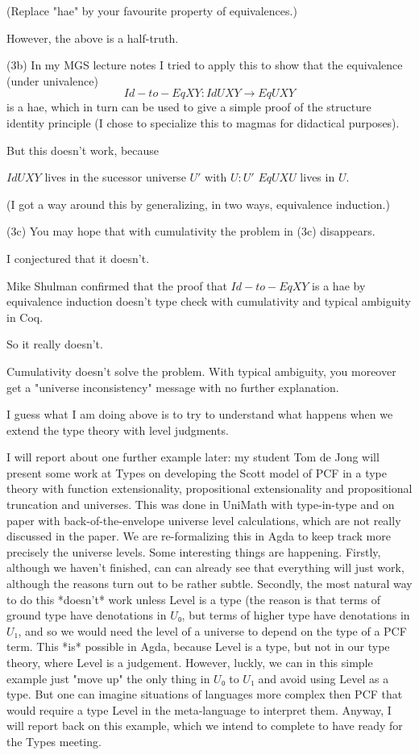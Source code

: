 \documentclass[11pt,a4paper]{article}
\begin{document}
     (Replace "hae" by your favourite property of equivalences.)

     However, the above is a half-truth.

(3b) In my MGS lecture notes I tried to apply this to show that the
      equivalence (under univalence)
$$
      Id-to-Eq X Y : Id U X Y →  Eq U X Y
$$
      is a hae, which in turn can be used to give a simple proof of the
      structure identity principle (I chose to specialize this to
      magmas for didactical purposes).

      But this doesn't work, because

          $Id U X Y$ lives in the sucessor universe $U'$ with $U:U'$
          $Eq U X U$ lives in $U$.

      (I got a way around this by generalizing, in two ways,
      equivalence induction.)

(3c) You may hope that with cumulativity the problem in (3c) disappears.

      I conjectured that it doesn't.

      Mike Shulman confirmed that the proof that $Id-to-Eq X Y$ is a hae
      by equivalence induction doesn't type check with cumulativity and
      typical ambiguity in Coq.

      So it really doesn't.

      Cumulativity doesn't solve the problem. With typical ambiguity,
      you moreover get a "universe inconsistency" message with no
      further explanation.

I guess what I am doing above is to try to understand what happens
when we extend the type theory with level judgments.

I will report about one further example later: my student Tom de Jong
will present some work at Types on developing the Scott model of PCF
in a type theory with function extensionality, propositional
extensionality and propositional truncation and universes. This was
done in UniMath with type-in-type and on paper with
back-of-the-envelope universe level calculations, which are not really
discussed in the paper. We are re-formalizing this in Agda to keep
track more precisely the universe levels. Some interesting things are
happening. Firstly, although we haven't finished, can can already see
that everything will just work, although the reasons turn out to be
rather subtle. Secondly, the most natural way to do this *doesn't*
work unless Level is a type (the reason is that terms of ground type
have denotations in $U₀$, but terms of higher type have denotations in
$U₁$, and so we would need the level of a universe to depend on the type
of a PCF term. This *is* possible in Agda, because Level is a type,
but not in our type theory, where Level is a judgement. However,
luckly, we can in this simple example just "move up" the only thing in
$U₀$ to $U₁$ and avoid using Level as a type. But one can imagine
situations of languages more complex then PCF that would require a
type Level in the meta-language to interpret them. Anyway, I will
report back on this example, which we intend to complete to have ready
for the Types meeting.
\end{document}
